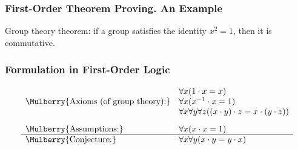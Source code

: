 





                     \begin{frame}\frametitle{First-Order Theorem
                         Proving. An Example}

\alert{Group theory theorem:} if a group
satisfies the identity $x^2 = 1$, then it is commutative. 



                                \end{frame}



                     \begin{frame}\frametitle{Formulation in First-Order Logic}


\[
  \begin{array}{ll}
          & \forall x(1 \cdot x = x) \\
    \Mulberry{\text{Axioms (of group theory):}}
          & \forall x(x^{-1} \cdot x = 1) \\
          & \forall x \forall y \forall z((x \cdot y) \cdot z = x \cdot (y \cdot z))\\[2ex]
    \Mulberry{\text{Assumptions:}}
          & \forall x(x \cdot x = 1) \\
    \hline
    \Mulberry{\text{Conjecture:}}
          & \forall x \forall y(x \cdot y = y \cdot x)
  \end{array}
\]


                                \end{frame}

